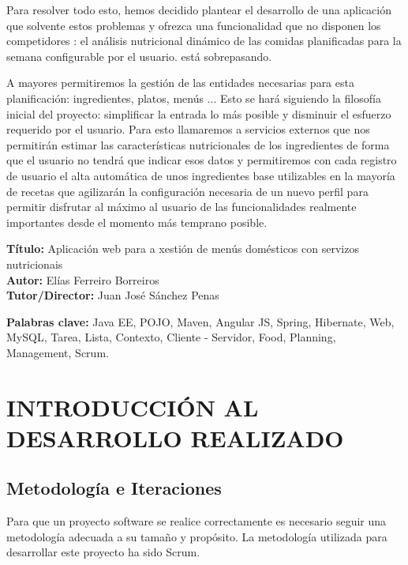 \documentclass[12pt, a4paper, twoside]{book}
\begin{document}
	Para resolver todo esto, hemos decidido plantear el desarrollo de una aplicación que solvente estos problemas y ofrezca una funcionalidad que no disponen los competidores : el análisis nutricional dinámico de las comidas planificadas para la semana configurable por el usuario. está sobrepasando.
	
	A mayores permitiremos la gestión de las entidades necesarias para esta planificación: ingredientes, platos, menús ... 
	Esto se hará siguiendo la filosofía inicial del proyecto: simplificar la entrada lo más posible y disminuir el esfuerzo requerido por el usuario. 
	Para esto llamaremos a servicios externos que nos permitirán estimar las características nutricionales de los ingredientes de forma que el usuario no tendrá que indicar esos datos y permitiremos con cada registro de usuario el alta automática de unos ingredientes base utilizables en la mayoría de recetas que agilizarán la configuración necesaria de un nuevo perfil para permitir disfrutar al máximo al usuario de las funcionalidades realmente importantes desde el momento más temprano posible.
	
	\clearpage
	
	\textbf{Título:} Aplicación web para a xestión de menús domésticos con servizos nutricionais
	\\
	\textbf{Autor:} Elías Ferreiro Borreiros
	\\
	\textbf{Tutor/Director:} Juan José Sánchez Penas
	
	
	\textbf{Palabras clave:} Java EE, POJO, Maven, Angular JS, Spring, Hibernate, Web, MySQL, Tarea, Lista, Contexto, Cliente - Servidor, Food, Planning, Management, Scrum. 
	
	
	\renewcommand{\contentsname}{Índice de contenidos}
	\renewcommand{\listfigurename}{Índice de figuras}
	\renewcommand{\listtablename}{Índice de tablas}
	
	\tableofcontents %
	
	\listoffigures %
	
	\listoftables %
	
	\clearpage
	
	\chapter{INTRODUCCIÓN AL DESARROLLO REALIZADO}
	\section{Metodología e Iteraciones}
	Para que un proyecto software se realice correctamente es necesario seguir una metodología adecuada a su tamaño y propósito. La metodología utilizada para desarrollar este proyecto ha sido Scrum.
\end{document}
